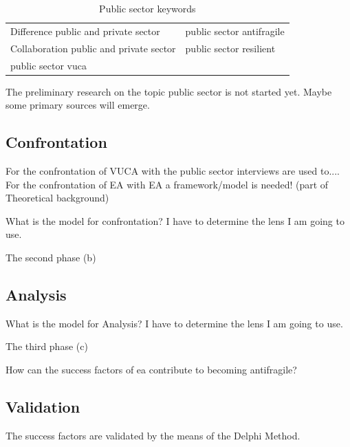 \begin{table}[H]
	\centering
	\begin{tabular}{p{}p{}}
		\toprule
		Difference public and private sector &	public sector \gls{antifragile}\\%
		Collaboration public and private sector & public sector \gls{resilient}\\%
		public sector \acrshort{vuca} & \\%
		\bottomrule
	\end{tabular}
	\caption{Public sector keywords}
	\label{tab:publicsectorkeywords}
\end{table}

\begin{remark}
	The preliminary research on the topic public sector is not started yet. Maybe some primary sources will emerge.
\end{remark}

\subsection{Confrontation}
\label{sub:confrontationphase}

For the confrontation of VUCA with the public sector interviews are used to....\\
For the confrontation of EA with EA a framework/model is needed! (part of Theoretical background)

\begin{remark}
	What is the model for confrontation?
	I have to determine the lens I am going to use.
\end{remark}

The second phase (b) 

\subsection{Analysis}
\label{sub:analysisphase}

\begin{remark}
	What is the model for Analysis?
	I have to determine the lens I am going to use.
\end{remark}

The third phase (c)

How can the success factors of \acrlong{ea} contribute to becoming antifragile?

\subsection{Validation}
\label{sub:validatinphase}
The success factors are validated by the means of the Delphi Method.


